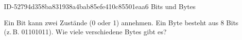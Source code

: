 \begin{exercise}
      {ID-52794d358ba831938a4bab85efe410c85501eaa6}
      {Bits und Bytes}
  \ifproblem\problem\par
    Ein Bit kann zwei Zustände (0 oder 1) annehmen. Ein Byte besteht aus 8 Bits
    (z.\,B. 01101011). Wie viele verschiedene Bytes gibt es?
  \fi
\end{exercise}
